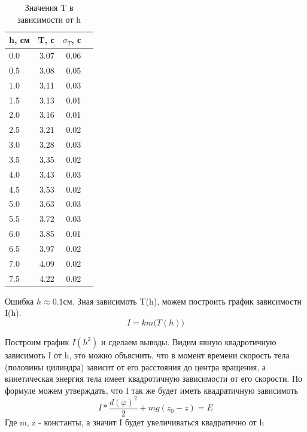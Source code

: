 \documentclass[a4paper, 12pt]{article}
\begin{document}
    \begin{table}[h!]
    \begin{center}
    \begin{tabular}{|l|r|r|r|}
    \hline
    h, см   &  T, с & $\sigma_T$, с\\
    \hline
    0.0 &  3.07 &  0.06 \\
    0.5 &  3.08 &  0.05 \\
    1.0 &  3.11 &  0.03 \\
    1.5 &  3.13 &  0.01 \\
    2.0 &  3.16 &  0.01 \\
    2.5 &  3.21 &  0.02 \\
    3.0 &  3.28 &  0.03 \\
    3.5 &  3.35 &  0.02 \\
    4.0 &  3.43 &  0.03 \\
    4.5 &  3.53 &  0.02 \\
    5.0 &  3.63 &  0.03 \\
    5.5 &  3.72 &  0.03 \\
    6.0 &  3.85 &  0.01 \\
    6.5 &  3.97 &  0.02 \\
    7.0 &  4.09 &  0.02 \\
    7.5 &  4.22 &  0.02 \\
    \hline
    \end{tabular}
    \end{center}
    \caption{Значения T в зависимости от h}

    \end{table}
    Ошибка $h \approx 0.1 см$. Зная зависимоть T(h), можем построить график зависимости I(h).
    \begin{equation}
        I = km\big(T(h)\big)
    \end{equation}


    Построим график $I(h^2)$ и сделаем выводы.
    \newline
    Видим явную квадротичную зависимоть I от h, это можно объяснить, что в момент времени скорость тела (половины цилиндра) зависит от его расстояния до центра вращения, а кинетическая энергия тела имеет квадротичную зависимости от его скорости.
    \newline
    По формуле можем утверждать, что I так же будет иметь квадратичную зависимоть 
    \begin{equation}
        I*\frac{d(\varphi)^2}{2} + mg(z_{0} - z) = E
    \end{equation}
    \newline
    Где m, z - константы, а значит I будет увеличиваться квадратично от h
    
\end{document}
